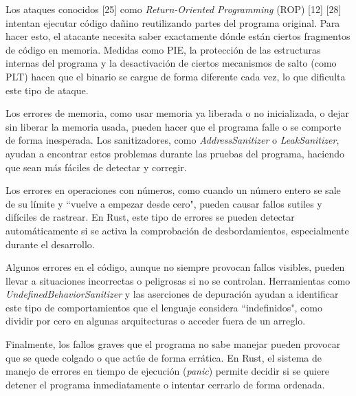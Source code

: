 Los ataques conocidos [25] como \emph{Return-Oriented Programming} (ROP) [12] [28] intentan ejecutar código dañino reutilizando partes del programa original. Para hacer esto, el atacante necesita saber exactamente dónde están ciertos fragmentos de código en memoria. Medidas como PIE, la protección de las estructuras internas del programa y la desactivación de ciertos mecanismos de salto (como PLT) hacen que el binario se cargue de forma diferente cada vez, lo que dificulta este tipo de ataque.

Los errores de memoria, como usar memoria ya liberada o no inicializada, o dejar sin liberar la memoria usada, pueden hacer que el programa falle o se comporte de forma inesperada. Los sanitizadores, como \emph{AddressSanitizer} o \emph{LeakSanitizer}, ayudan a encontrar estos problemas durante las pruebas del programa, haciendo que sean más fáciles de detectar y corregir.

Los errores en operaciones con números, como cuando un número entero se sale de su límite y ``vuelve a empezar desde cero", pueden causar fallos sutiles y difíciles de rastrear. En Rust, este tipo de errores se pueden detectar automáticamente si se activa la comprobación de desbordamientos, especialmente durante el desarrollo.

Algunos errores en el código, aunque no siempre provocan fallos visibles, pueden llevar a situaciones incorrectas o peligrosas si no se controlan. Herramientas como \emph{UndefinedBehaviorSanitizer} y las aserciones de depuración ayudan a identificar este tipo de comportamientos que el lenguaje considera ``indefinidos", como dividir por cero en algunas arquitecturas o acceder fuera de un arreglo.

Finalmente, los fallos graves que el programa no sabe manejar pueden provocar que se quede colgado o que actúe de forma errática. En Rust, el sistema de manejo de errores en tiempo de ejecución (\emph{panic}) permite decidir si se quiere detener el programa inmediatamente o intentar cerrarlo de forma ordenada.